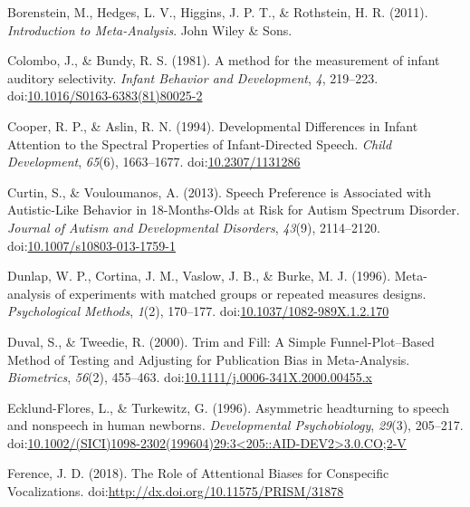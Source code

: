 \documentclass[man]{apa6}
\begin{document}
\hypertarget{ref-borenstein_introduction_2011}{}
Borenstein, M., Hedges, L. V., Higgins, J. P. T., \& Rothstein, H. R.
(2011). \emph{Introduction to Meta-Analysis}. John Wiley \& Sons.

\hypertarget{ref-colombo_method_1981}{}
Colombo, J., \& Bundy, R. S. (1981). A method for the measurement of
infant auditory selectivity. \emph{Infant Behavior and Development},
\emph{4}, 219--223.
doi:\href{https://doi.org/10.1016/S0163-6383(81)80025-2}{10.1016/S0163-6383(81)80025-2}

\hypertarget{ref-cooper_developmental_1994}{}
Cooper, R. P., \& Aslin, R. N. (1994). Developmental Differences in
Infant Attention to the Spectral Properties of Infant-Directed Speech.
\emph{Child Development}, \emph{65}(6), 1663--1677.
doi:\href{https://doi.org/10.2307/1131286}{10.2307/1131286}

\hypertarget{ref-curtin_speech_2013}{}
Curtin, S., \& Vouloumanos, A. (2013). Speech Preference is Associated
with Autistic-Like Behavior in 18-Months-Olds at Risk for Autism
Spectrum Disorder. \emph{Journal of Autism and Developmental Disorders},
\emph{43}(9), 2114--2120.
doi:\href{https://doi.org/10.1007/s10803-013-1759-1}{10.1007/s10803-013-1759-1}

\hypertarget{ref-dunlap_meta-analysis_1996}{}
Dunlap, W. P., Cortina, J. M., Vaslow, J. B., \& Burke, M. J. (1996).
Meta-analysis of experiments with matched groups or repeated measures
designs. \emph{Psychological Methods}, \emph{1}(2), 170--177.
doi:\href{https://doi.org/10.1037/1082-989X.1.2.170}{10.1037/1082-989X.1.2.170}

\hypertarget{ref-duval_trim_2000}{}
Duval, S., \& Tweedie, R. (2000). Trim and Fill: A Simple
Funnel-Plot--Based Method of Testing and Adjusting for Publication Bias
in Meta-Analysis. \emph{Biometrics}, \emph{56}(2), 455--463.
doi:\href{https://doi.org/10.1111/j.0006-341X.2000.00455.x}{10.1111/j.0006-341X.2000.00455.x}

\hypertarget{ref-ecklund-flores_asymmetric_1996}{}
Ecklund-Flores, L., \& Turkewitz, G. (1996). Asymmetric headturning to
speech and nonspeech in human newborns. \emph{Developmental
Psychobiology}, \emph{29}(3), 205--217.
doi:\href{https://doi.org/10.1002/(SICI)1098-2302(199604)29:3\%3C205::AID-DEV2\%3E3.0.CO;2-V}{10.1002/(SICI)1098-2302(199604)29:3\textless{}205::AID-DEV2\textgreater{}3.0.CO;2-V}

\hypertarget{ref-ference_role_2018}{}
Ference, J. D. (2018). The Role of Attentional Biases for Conspecific
Vocalizations.
doi:\href{https://doi.org/http://dx.doi.org/10.11575/PRISM/31878}{http://dx.doi.org/10.11575/PRISM/31878}
\end{document}
